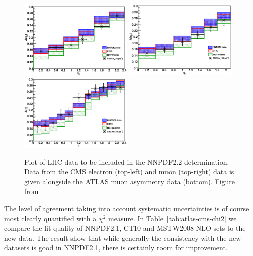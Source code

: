 \begin{figure}[h!]
  \centering
  \includegraphics[width=0.48\textwidth]{6-LHCimpact/figs/cms_el_25pt.eps}
  \includegraphics[width=0.48\textwidth]{6-LHCimpact/figs/cms_mu_25pt.eps}\\
    \includegraphics[width=0.48\textwidth]{6-LHCimpact/figs/atlas.eps}

  \caption[Plot of LHC data to be included in the NNPDF2.2 determination. ]{Plot of LHC data to be included in the NNPDF2.2 determination. Data from the CMS electron (top-left) and muon (top-right) data is given alongside the ATLAS muon asymmetry data (bottom). Figure from~\cite{Ball:2011gg}.}
  \label{fig:22LHCdat}
\end{figure}

The level of agreement taking into account systematic uncertainties is of course most clearly quantified with a $\chi^2$ measure. In Table~\ref{tab:atlas-cms-chi2} we compare the fit quality of NNPDF2.1, CT10 and MSTW2008 NLO sets to the new data. The result show that while generally the consistency with the new datasets is good in NNPDF2.1, there is certainly room for improvement.


